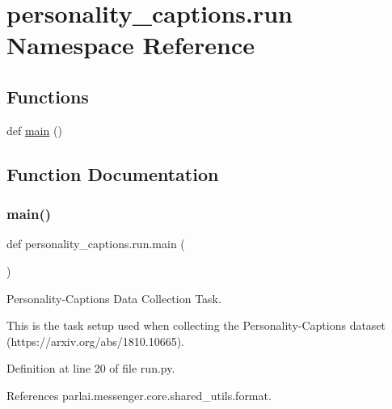 \hypertarget{namespacepersonality__captions_1_1run}{}\section{personality\+\_\+captions.\+run Namespace Reference}
\label{namespacepersonality__captions_1_1run}
\subsection*{Functions}
\begin{DoxyCompactItemize}
\item 
def \hyperlink{namespacepersonality__captions_1_1run_a6cc04d2f2bf859221adef60a6ea0857f}{main} ()
\end{DoxyCompactItemize}


\subsection{Function Documentation}
\mbox{\label{namespacepersonality__captions_1_1run_a6cc04d2f2bf859221adef60a6ea0857f}} 
\subsubsection{\texorpdfstring{main()}{main()}}
{\footnotesize\ttfamily def personality\+\_\+captions.\+run.\+main (\begin{DoxyParamCaption}{ }\end{DoxyParamCaption})}

\begin{DoxyVerb}    Personality-Captions Data Collection Task.

    This is the task setup used when collecting the Personality-Captions
    dataset (https://arxiv.org/abs/1810.10665).
\end{DoxyVerb}
 

Definition at line 20 of file run.\+py.



References parlai.\+messenger.\+core.\+shared\+\_\+utils.\+format.

